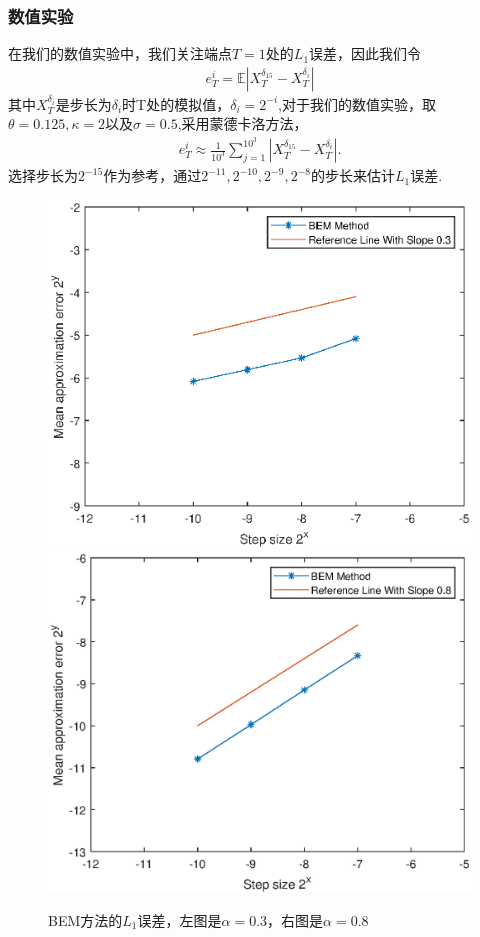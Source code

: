 \documentclass[12pt,final]{article}
\numberwithin{equation}{section}
\numberwithin{figure}{section}
\numberwithin{table}{section}
\theoremstyle{plain}
\theoremstyle{definition}
\theoremstyle{remark}
\begin{document}
\subsubsection{数值实验}
在我们的数值实验中，我们关注端点$T = 1$处的$L_1$误差，因此我们令
\begin{align*}
	e_T^{i}=\mathbb{E}\left|X_T^{\delta _{15}}-X_T^{\delta _i}\right|
\end{align*}
其中$X_T^{\delta _i}$是步长为$\delta _i$时T处的模拟值，$\delta _i = 2^{-i}$,对于我们的数值实验，取$\theta=0.125,\kappa=2$以及$\sigma=0.5$,采用蒙德卡洛方法，
\begin{align*}
	e_{T}^i\approx\frac{1}{10^3}\sum_{j=1}^{10^3}\left|X_T^{\delta _{15}}-X_T^{\delta _i}\right|.
\end{align*}
选择步长为$2^{-15}$作为参考，通过${2^{-11},2^{-10},2^{-9},2^{-8}}$的步长来估计$L_1$误差.

\begin{figure}[htp!]
	\centering
	\includegraphics[width=0.45\linewidth]{BEMalpha=0.3.eps}
	\hfill
	\includegraphics[width=0.45\linewidth]{BEMalpha=0.8.eps}
	\caption{BEM方法的$L_1$误差，左图是$\alpha=0.3$，右图是$\alpha=0.8$}
	\label{fig:image}
	\vspace{-2ex}
\end{figure}
\end{document}
